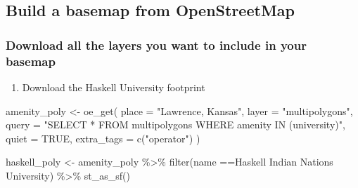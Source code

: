 \documentclass[
  paper=a4,
  ,captions=tableheading
]{scrartcl}
\newenvironment{Shaded}{\begin{snugshade}}{\end{snugshade}}
\newcommand{\AttributeTok}[1]{\textcolor[rgb]{0.77,0.63,0.00}{#1}}
\newcommand{\ConstantTok}[1]{\textcolor[rgb]{0.00,0.00,0.00}{#1}}
\newcommand{\FunctionTok}[1]{\textcolor[rgb]{0.00,0.00,0.00}{#1}}
\newcommand{\NormalTok}[1]{#1}
\newcommand{\OtherTok}[1]{\textcolor[rgb]{0.56,0.35,0.01}{#1}}
\newcommand{\SpecialCharTok}[1]{\textcolor[rgb]{0.00,0.00,0.00}{#1}}
\newcommand{\StringTok}[1]{\textcolor[rgb]{0.31,0.60,0.02}{#1}}
\providecommand{\tightlist}{%
  \setlength{\itemsep}{0pt}\setlength{\parskip}{0pt}}
\begin{document}
\hypertarget{build-a-basemap-from-openstreetmap}{%
\subsection{Build a basemap from
OpenStreetMap}\label{build-a-basemap-from-openstreetmap}}

\hypertarget{download-all-the-layers-you-want-to-include-in-your-basemap}{%
\subsubsection{Download all the layers you want to include in your
basemap}\label{download-all-the-layers-you-want-to-include-in-your-basemap}}

\begin{enumerate}
\def\labelenumi{\arabic{enumi}.}
\tightlist
\item
  Download the Haskell University footprint
\end{enumerate}

\begin{Shaded}
\begin{Highlighting}[]
\NormalTok{amenity\_poly }\OtherTok{\textless{}{-}} \FunctionTok{oe\_get}\NormalTok{(}
  \AttributeTok{place =} \StringTok{"Lawrence, Kansas"}\NormalTok{, }
  \AttributeTok{layer =} \StringTok{"multipolygons"}\NormalTok{,}
  \AttributeTok{query =} \StringTok{"SELECT * FROM multipolygons WHERE amenity IN (\textquotesingle{}university\textquotesingle{})"}\NormalTok{,}
  \AttributeTok{quiet =} \ConstantTok{TRUE}\NormalTok{,}
  \AttributeTok{extra\_tags =} \FunctionTok{c}\NormalTok{(}\StringTok{"operator"}\NormalTok{)}
\NormalTok{)}


\NormalTok{haskell\_poly }\OtherTok{\textless{}{-}}\NormalTok{ amenity\_poly }\SpecialCharTok{\%\textgreater{}\%}
  \FunctionTok{filter}\NormalTok{(name }\SpecialCharTok{==}\StringTok{\textquotesingle{}Haskell Indian Nations University\textquotesingle{}}\NormalTok{) }\SpecialCharTok{\%\textgreater{}\%}
  \FunctionTok{st\_as\_sf}\NormalTok{()}
\end{Highlighting}
\end{Shaded}
\end{document}

